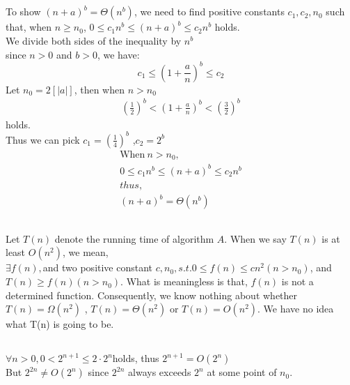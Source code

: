 \documentclass[paper=a4, fontsize=11pt,oneside]{book} %
\numberwithin{equation}{section} %
\numberwithin{figure}{section} %
\numberwithin{table}{section} %
\begin{document}
	\subsection{}
			To show $(n+a)^b = \Theta (n^b)$, we need to find positive constants $c_1, c_2, n_0$ such that, when $n \geq n_0$, $0 \leq c_1n^b \leq (n+a)^b \leq c_2n^b$ holds. \\
			We divide both sides of the inequality by $n^b$ \\
			 since $n > 0$ and $ b > 0$, we have:
			 \begin{equation*}
			 c_1 \leq (1 + \frac{a}{n})^b \leq c_2
			 \end{equation*}
			 Let $n_0 = 2[|a|]$, then when $ n > n_0$
			 \begin{align*}
			 (\frac{1}{2})^b < (1+\frac{a}{n})^b < (\frac{3}{2})^b 
			 \end{align*}
			 holds.\\
			 Thus we can pick $c_1 = (\frac{1}{4})^b$	,$c_2 = 2^b$
			 \begin{align*}
			 \text{When}\  n > n_0, \\
			 0 \leq c_1n^b \leq (n+a)^b \leq c_2n^b \\
			 thus, \\
			 (n+a)^b = \Theta(n^b)
			 \end{align*}
			 
	\subsection{}
		Let $T(n)$ denote the running time of algorithm $A$. When we say $T(n)$ is at least $O(n^2)$, we mean,\\
		$\exists f(n), $and two positive constant $c, n_0, s.t. 0 \leq f(n) \leq cn^2( n > n_0)$, and $T(n) \geq f(n)(n > n_0)$.
		What is meaningless is that, $f(n)$ is not a determined function. Consequently, we know nothing about whether $T(n) = \Omega(n^2)$ , $T(n) = \Theta(n^2)$ or $T(n) = O(n^2)$. We have no idea what T(n) is going to be.		
		
	\subsection{}
		$\forall n > 0, 0 < 2^{n+1} \leq 2\cdot 2^n $holds, thus $2^{n+1} = O(2^n)$ \\
		But $2^{2n} \neq O(2^n)$ since $2^{2n}$ always exceeds $2^n$ at some point of $n_0$. 
		
\end{document}
